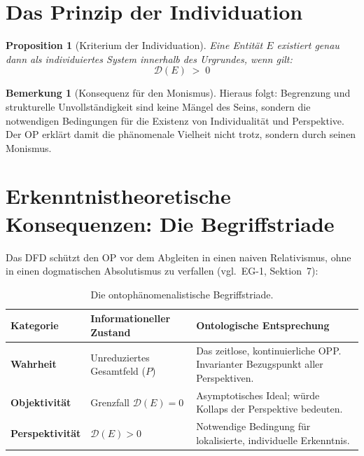 \documentclass[11pt,a4paper]{article}
\theoremstyle{plain}
\newtheorem{proposition}{Proposition}[section]
\theoremstyle{definition}
\newtheorem{remark}{Bemerkung}[section]
\begin{document}
\section{Das Prinzip der Individuation}

\begin{proposition}[Kriterium der Individuation]
Eine Entit\"{a}t $E$ existiert genau dann als individuiertes System innerhalb des
Urgrundes, wenn gilt:
\[
  \mathcal{D}(E) \;>\; 0
\]
\end{proposition}

\begin{remark}[Konsequenz f\"{u}r den Monismus]
Hieraus folgt: Begrenzung und strukturelle Unvollst\"{a}ndigkeit sind keine M\"{a}ngel
des Seins, sondern die notwendigen Bedingungen f\"{u}r die Existenz von Individualit\"{a}t
und Perspektive. Der OP erkl\"{a}rt damit die ph\"{a}nomenale Vielheit nicht trotz,
sondern durch seinen Monismus.
\end{remark}

\section{Erkenntnistheoretische Konsequenzen: Die Begriffstriade}

Das DFD sch\"{u}tzt den OP vor dem Abgleiten in einen naiven Relativismus, ohne in
einen dogmatischen Absolutismus zu verfallen (vgl.\ EG-1, Sektion~7):

\begin{table}[h!]
\centering
\small
\begin{tabular}{p{2.8cm}p{4.5cm}p{5.5cm}}
  \toprule
  \textbf{Kategorie} & \textbf{Informationeller Zustand} & \textbf{Ontologische
  Entsprechung} \\
  \midrule
  \textbf{Wahrheit} & Unreduziertes Gesamtfeld ($P$) &
    Das zeitlose, kontinuierliche OPP. Invarianter Bezugspunkt aller Perspektiven. \\[4pt]
  \textbf{Objektivit\"{a}t} & Grenzfall $\mathcal{D}(E) = 0$ &
    Asymptotisches Ideal; w\"{u}rde Kollaps der Perspektive bedeuten. \\[4pt]
  \textbf{Perspektivit\"{a}t} & $\mathcal{D}(E) > 0$ &
    Notwendige Bedingung f\"{u}r lokalisierte, individuelle Erkenntnis. \\
  \bottomrule
\end{tabular}
\caption{Die ontoph\"{a}nomenalistische Begriffstriade.}
\end{table}
\end{document}
